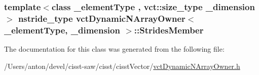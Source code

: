 \subsubsection[{Strides\+Member}]{\setlength{\rightskip}{0pt plus 5cm}template$<$class \+\_\+element\+Type , vct\+::size\+\_\+type \+\_\+dimension$>$ nstride\+\_\+type {\bf vct\+Dynamic\+N\+Array\+Owner}$<$ \+\_\+element\+Type, \+\_\+dimension $>$\+::Strides\+Member\hspace{0.3cm}{\ttfamily [protected]}}\label{classvct_dynamic_n_array_owner_a7a9e21f0f52c3ca29da81f404eaaafcb}


The documentation for this class was generated from the following file\+:\begin{DoxyCompactItemize}
\item 
/\+Users/anton/devel/cisst-\/saw/cisst/cisst\+Vector/\hyperlink{vct_dynamic_n_array_owner_8h}{vct\+Dynamic\+N\+Array\+Owner.\+h}\end{DoxyCompactItemize}
